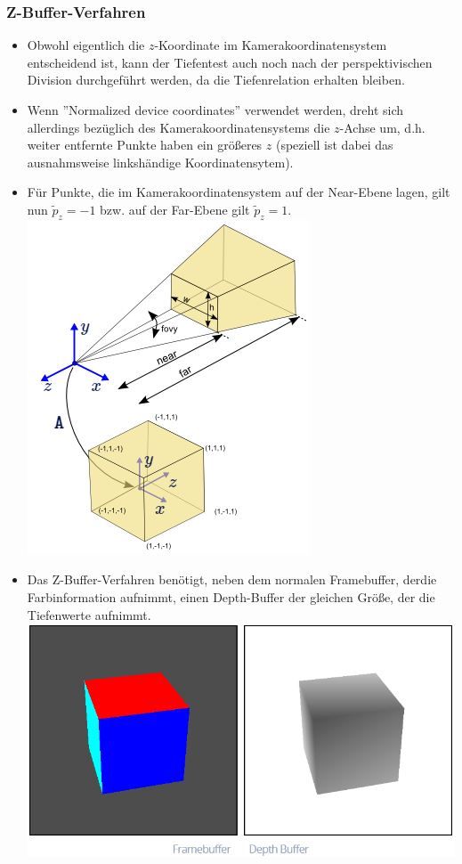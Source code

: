 \documentclass{scrartcl}
\begin{document}
\subsubsection{Z-Buffer-Verfahren}

\begin{itemize}
	\item Obwohl eigentlich die $z$-Koordinate im Kamerakoordinatensystem entscheidend ist, kann der Tiefentest auch noch nach der perspektivischen Division durchgeführt werden, da die Tiefenrelation erhalten bleiben.
	\item Wenn ''Normalized device coordinates'' verwendet werden, dreht sich allerdings bezüglich des Kamerakoordinatensystems die $z$-Achse um, d.h. weiter entfernte Punkte haben ein größeres $z$ (speziell ist dabei das ausnahmsweise linkshändige Koordinatensytem).
	\item Für Punkte, die im Kamerakoordinatensystem auf der Near-Ebene lagen, gilt nun $\widetilde{p}_z = -1$ bzw. auf der Far-Ebene gilt $\widetilde{p}_z = 1$. \\
	\includegraphics[scale=0.5]{figures/gluperspective.png}
	\item Das Z-Buffer-Verfahren benötigt, neben dem normalen Framebuffer, derdie Farbinformation aufnimmt, einen Depth-Buffer der gleichen Größe, der die Tiefenwerte aufnimmt. \\
	\includegraphics[scale=0.5]{figures/frame_vs_depthbuffer.png}

\end{itemize}
\end{document}

